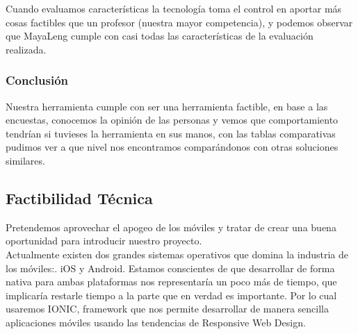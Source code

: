 \documentclass[a4paper,openright,11pt]{article}
\begin{document}
\begin{table}[H]
\caption{Comparativa de Caracter\'isticas}
Cuando evaluamos características la tecnología toma el control en aportar más cosas factibles que un profesor (nuestra mayor competencia), y podemos observar que MayaLeng cumple con casi todas las características de la evaluación realizada.
\end{table}

\subsubsection{Conclusión}
Nuestra herramienta cumple con ser una herramienta factible, en base a las encuestas, conocemos la opinión de las personas y vemos que comportamiento tendrían si tuvieses la herramienta en sus manos, con las tablas comparativas pudimos ver a que nivel nos encontramos comparándonos con otras soluciones similares.

\newpage
\subsection{Factibilidad T\'ecnica}
Pretendemos aprovechar el apogeo de los m\'oviles y tratar de crear una buena oportunidad para introducir nuestro proyecto.\\
Actualmente existen dos grandes sistemas operativos que domina la industria de los m\'oviles:. iOS y Android. Estamos conscientes de que desarrollar de forma nativa para ambas plataformas nos representar\'ia un poco m\'as de tiempo, que implicar\'ia restarle tiempo a la parte que en verdad es importante. Por lo cual usaremos IONIC, framework que nos permite desarrollar de manera sencilla aplicaciones m\'oviles usando las tendencias de Responsive Web Design. \\
\end{document}
